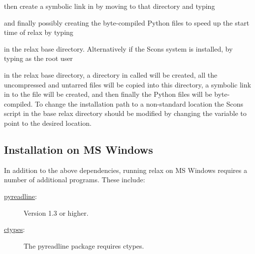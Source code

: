 
then create a symbolic link in  by moving to that directory and typing


and finally possibly creating the byte-compiled Python  files to speed up the start time of relax by typing


in the relax base directory.
Alternatively if the Scons system is installed, by typing as the root user


in the relax base directory, a directory in  called  will be created, all the uncompressed and untarred files will be copied into this directory, a symbolic link in  to the file  will be created, and then finally the Python  files will be byte-compiled.
To change the installation path to a non-standard location the Scons script  in the base relax directory should be modified by changing the variable  to point to the desired location.



\subsection{Installation on MS Windows}

In addition to the above dependencies, running relax on MS Windows requires a number of additional programs.
These include:
\begin{description}
  \item[\href{http://projects.scipy.org/ipython/ipython/wiki/PyReadline/Intro}{pyreadline}:]  Version 1.3 or higher.
  \item[\href{http://starship.python.net/crew/theller/ctypes/}{ctypes}:]  The pyreadline package requires ctypes.
\end{description}


